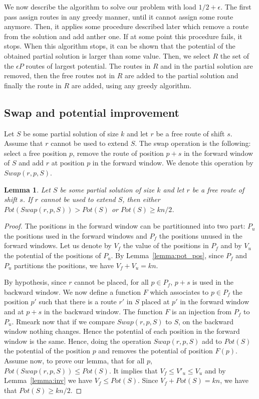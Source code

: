 \documentclass[10pt, conference, letterpaper]{IEEEtran}
\newtheorem{lemma}[theorem]{Lemma}
\begin{document}
We now describe the algorithm to solve our problem with load $1/2 + \epsilon$. The first pass assign routes in any
greedy manner, until it cannot assign some route anymore. Then, it applies some procedure described later which 
remove a route from the solution and add anther one. If at some point this procedure fails, it stops.
When this algorithm stops, it can be shown that the potential of the obtained partial solution is larger
than some value. Then, we select $R$ the set of the $\epsilon P$ routes of largest potential. The routes in $R$ and in the partial solution are removed, then the free routes not in $R$ are added to the partial solution and 
finally the route in $R$ are added, using any greedy algorithm.

\subsection{Swap and potential improvement}


Let $S$ be some partial solution of size $k$ and let $r$ be a free route of shift $s$. 
Assume that $r$ cannot be used to extend $S$. The swap operation is the following: 
select a free position $p$, remove the route of position $p+s$ in the forward window 
of $S$ and add $r$ at position $p$ in the forward window. We denote this operation by $Swap(r,p,S)$.

\begin{lemma}
Let $S$ be some partial solution of size $k$ and let $r$ be a free route of shift $s$. 
If $r$ cannot be used to extend $S$, then either $Pot(Swap(r,p,S)) > Pot(S)$ or 
$Pot(S) \geq kn/2$.
\end{lemma}

\begin{proof}\label{swap}
The positions in the forward window can be partitionned into two part: $P_{u}$ the positions used in the forward windows and $P_{f}$ the positions unused in the forward windows.
Let us denote by $V_f$ the value of the positions in $P_f$ and by $V_u$ the potential of the positions of $P_u$. By Lemma~\ref{lemma:pot_pos}, since $P_f$ and $P_u$ partitions the positions, we have $V_f + V_u = kn$.

By hypothesis, since $r$ cannot be placed, for all $p \in P_{f}$, $p+s$ is used in the backward window. We now define a function $F$ which associates to $p \in P_{f}$ the position $p'$ such that there is a route $r'$ in $S$ placed at $p'$ in the forward window and at $p+s$ in the backward window. The function $F$ is an injection from $P_{f}$ to $P_u$. Rmeark now that if we compare $Swap(r,p,S)$ to $S$, on the backward window nothing changes. 
Hence the potential of each position in the forward window is the same. Hence, doing the operation $Swap(r,p,S)$ add to $Pot(S)$ the potential of the position $p$ and removes the potential of position $F(p)$. 
Assume now, to prove our lemma, that for all $p$, $Pot(Swap(r,p,S)) \leq Pot(S)$. It implies that 
$V_f \leq V'_u \leq V_u$ and by Lemma~\ref{lemma:inv} we have $V_f \leq Pot(S)$.
Since $V_f + Pot(S) = kn$, we have that $Pot(S) \geq kn/2$.
\end{proof}
\end{document}
